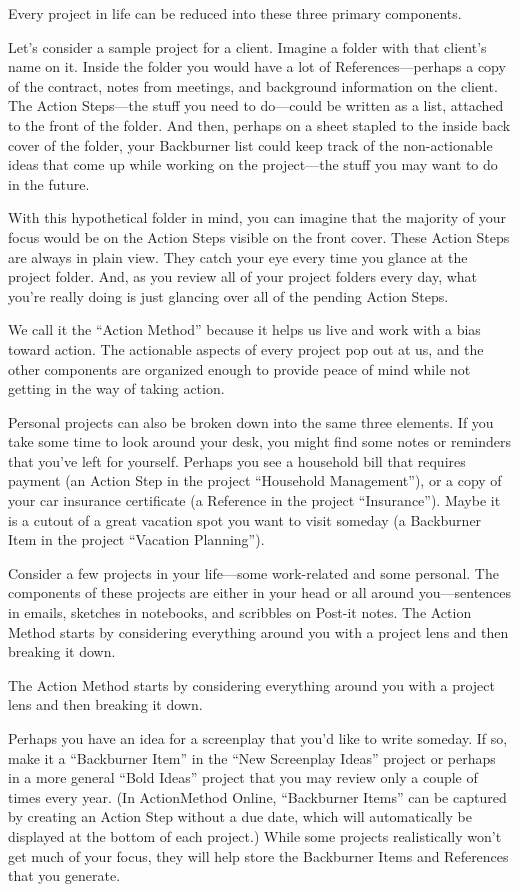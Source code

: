 Every project in life can be reduced into these three primary components.

Let’s consider a sample project for a client. Imagine a folder with that client’s name on it. Inside the folder you would have a lot of References—perhaps a copy of the contract, notes from meetings, and background information on the client. The Action Steps—the stuff you need to do—could be written as a list, attached to the front of the folder. And then, perhaps on a sheet stapled to the inside back cover of the folder, your Backburner list could keep track of the non-actionable ideas that come up while working on the project—the stuff you may want to do in the future.

With this hypothetical folder in mind, you can imagine that the majority of your focus would be on the Action Steps visible on the front cover. These Action Steps are always in plain view. They catch your eye every time you glance at the project folder. And, as you review all of your project folders every day, what you’re really doing is just glancing over all of the pending Action Steps.

We call it the “Action Method” because it helps us live and work with a bias toward action. The actionable aspects of every project pop out at us, and the other components are organized enough to provide peace of mind while not getting in the way of taking action.

Personal projects can also be broken down into the same three elements. If you take some time to look around your desk, you might find some notes or reminders that you’ve left for yourself. Perhaps you see a household bill that requires payment (an Action Step in the project “Household Management”), or a copy of your car insurance certificate (a Reference in the project “Insurance”). Maybe it is a cutout of a great vacation spot you want to visit someday (a Backburner Item in the project “Vacation Planning”).

Consider a few projects in your life—some work-related and some personal. The components of these projects are either in your head or all around you—sentences in emails, sketches in notebooks, and scribbles on Post-it notes. The Action Method starts by considering everything around you with a project lens and then breaking it down.

The Action Method starts by considering everything around you with a project lens and then breaking it down.

Perhaps you have an idea for a screenplay that you’d like to write someday. If so, make it a “Backburner Item” in the “New Screenplay Ideas” project or perhaps in a more general “Bold Ideas” project that you may review only a couple of times every year. (In ActionMethod Online, “Backburner Items” can be captured by creating an Action Step without a due date, which will automatically be displayed at the bottom of each project.) While some projects realistically won’t get much of your focus, they will help store the Backburner Items and References that you generate.

